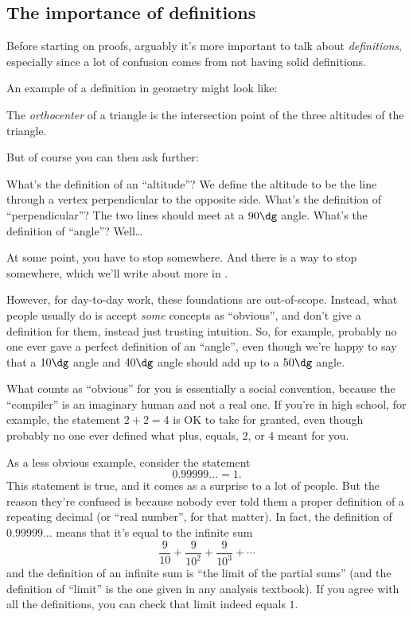 \documentclass[11pt]{scrartcl}
\begin{document}
\subsection{The importance of definitions}
Before starting on proofs,
arguably it's more important to talk about \emph{definitions},
especially since a lot of confusion comes from not having solid definitions.

An example of a definition in geometry might look like:
\begin{definition}
  The \emph{orthocenter} of a triangle is the intersection
  point of the three altitudes of the triangle.
\end{definition}
But of course you can then ask further:
\begin{itemize}
  \ii What's the definition of an ``altitude''?
  We define the altitude to be the line
  through a vertex perpendicular to the opposite side.
  \ii What's the definition of ``perpendicular''?
  The two lines should meet at a $90\dg$ angle.
  \ii What's the definition of ``angle''? Well\dots
\end{itemize}
At some point, you have to stop somewhere.
And there is a way to stop somewhere,
which we'll write about more in .

However, \alert{for day-to-day work, these foundations are out-of-scope}.
Instead, what people usually do is accept \emph{some} concepts as ``obvious'',
and don't give a definition for them, instead just trusting intuition.
So, for example, probably no one ever gave a perfect definition of an ``angle'',
even though we're happy to say that a $10\dg$ angle and $40\dg$ angle
should add up to a $50\dg$ angle.

What counts as ``obvious'' for you is essentially a social convention,
because the ``compiler'' is an imaginary human and not a real one.
If you're in high school, for example, the statement $2+2=4$
is OK to take for granted, even though probably no one ever defined what
plus, equals, $2$, or $4$ meant for you.

As a less obvious example, consider the statement
\[ 0.99999\dotso = 1. \]
This statement is true, and it comes as a surprise to a lot of people.
But the reason they're confused is because nobody ever told them a
proper definition of a repeating decimal (or ``real number'', for that matter).
In fact, the definition of $0.99999\dots$ means
that it's equal to the infinite sum
\[ \frac{9}{10} + \frac{9}{10^2} + \frac{9}{10^3} + \dotsb \]
and the definition of an infinite sum is ``the limit of the partial sums''
(and the definition of ``limit'' is the one given in any analysis textbook).
If you agree with all the definitions, you can check that limit indeed equals $1$.
\end{document}
